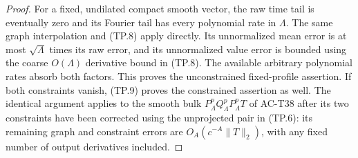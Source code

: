 \begin{proof}
For a fixed, undilated compact smooth vector,
the raw time tail is eventually zero and its Fourier
tail has every polynomial rate in \(\Lambda\).
The same graph interpolation and (TP.8) apply directly.
Its unnormalized mean error is at most
\(\sqrt{\Lambda}\) times its raw error, and its
unnormalized value error is bounded using the
coarse \(O(\Lambda)\) derivative bound in (TP.8).
The available arbitrary polynomial rates absorb
both factors.  This proves the unconstrained
fixed-profile assertion.  If both constraints vanish,
(TP.9) proves the constrained assertion as well.
The identical argument
applies to the smooth bulk \(P_\Lambda^pQ_\Lambda^p
P_\Lambda^pT\) of AC-T38 after its two constraints
have been corrected using the unprojected pair
in (TP.6): its remaining graph and constraint
errors are \(O_A(c^{-A}\|T\|_2)\), with any fixed
number of output derivatives included.
\end{proof}

